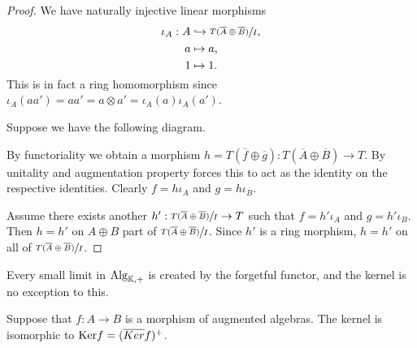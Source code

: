 \documentclass[../thesis.tex]{subfiles}
\begin{document}
                \begin{proof}
                    We have naturally injective linear morphisms
                    \begin{align*}
                        \iota_A : A & \hookrightarrow \sfrac{T(\overline{A}\oplus \overline{B})}{I}\tt{,} \\ 
                        a & \mapsto a\tt{,} \\
                        1 & \mapsto 1\tt{.}
                    \end{align*}
                    This is in fact a ring homomorphism since $\iota_A(aa') = aa' = a\otimes a' = \iota_A(a)\iota_A(a')$.

                    Suppose we have the following diagram.
                    \begin{center}
                    \end{center}
                    By functoriality we obtain a morphism $h = T(\overline{f}\oplus \overline{g}) : T(\overline{A} \oplus \overline{B}) \rightarrow T$. By unitality and augmentation property forces this to act as the identity on the respective identities. Clearly $f = h \iota_A$ and $g = h \iota_B$.

                    Assume there exists another $h' : \sfrac{T(\overline{A}\oplus \overline{B})}{I} \rightarrow T$ such that $f = h' \iota_A$ and $g = h' \iota_B$. Then $h = h'$ on $A \oplus B$ part of $\sfrac{T(\overline{A}\oplus \overline{B})}{I}$. Since $h'$ is a ring morphism, $h = h'$ on all of $\sfrac{T(\overline{A}\oplus \overline{B})}{I}$.
                \end{proof}

                Every small limit in $\tt{Alg}_{\mathbb{K},+}$ is created by the forgetful functor, and the kernel is no exception to this.

                \begin{lemma}
                    Suppose that $f : A \rightarrow B$ is a morphism of augmented algebras. The kernel is isomorphic to $\tt{Ker}f = (\overline{Ker}f)^+$.
                \end{lemma}
\end{document}
